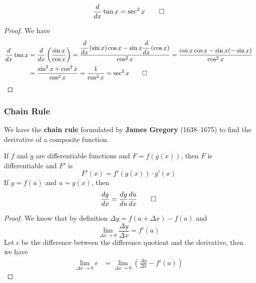 \begin{theorem}
    \[\frac{d}{dx}\tan x=\sec^2 x \qedhere\]
\end{theorem}
\begin{proof}
    We have
    \begin{align*}
        \frac{d}{dx}\tan x&= \frac{d}{dx}\left(\frac{\sin x}{\cos x}\right)
        =\frac{\cfrac{d}{dx}\left(\sin x\right)\cos x
        -\sin x\cfrac{d}{dx}\left(\cos x\right)}{\cos^2 x}
        =\frac{\cos x\cos x-\sin x(-\sin x)}{\cos^2 x}  \\
        &= \frac{\sin^2 x+\cos^2 x}{\cos^2 x}=\frac{1}{\cos^2 x}
        =\sec^2 x \qedhere
    \end{align*}
\end{proof}

\subsubsection{Chain Rule}
We have the \textbf{chain rule} formulated by \textbf{James Gregory}
(1638--1675) to find the derivative of a composite function.
\begin{theorem}
    If \(f\) and \(g\) are differentiable functions and \(F=f(g(x))\),
    then \(F\) is differentiable and \(F'\) is
    \[F'(x)=f'(g(x))\cdot g'(x)\]
    If \(y=f(u)\) and \(u=g(x)\), then
    \[\frac{dy}{dx}=\frac{dy}{du}\frac{du}{dx} \qedhere\]
\end{theorem}
\begin{proof}
    We know that by definition \(\Delta y=f(a+\Delta x)-f(a)\) and
    \[\lim_{\Delta x\to 0}\frac{\Delta y}{\Delta x}=f'(a)\]
    Let \(\epsilon\) be the difference between the difference quotient and the
    derivative, then we have
    \begin{align*}
        \lim_{\Delta x\to 0}\epsilon
        &= \lim_{\Delta x\to 0}\left(\frac{\Delta y}{\Delta x}-f'(a)\right)
    \end{align*}
\end{proof}